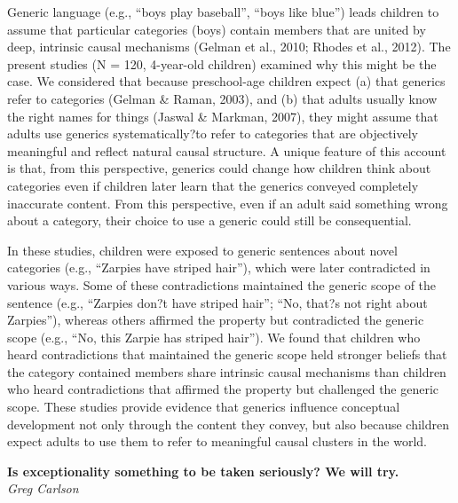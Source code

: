 \documentclass[10pt,letterpaper]{article}
\begin{document}
Generic language (e.g., ``boys play baseball'', ``boys like blue'') leads children to assume that particular categories (boys) contain members that are united by deep, intrinsic causal mechanisms (Gelman et al., 2010; Rhodes et al., 2012). 
The present studies (N = 120, 4-year-old children) examined why this might be the case. 
We considered that because preschool-age children expect (a) that generics refer to categories (Gelman \& Raman, 2003), and (b) that adults usually know the right names for things (Jaswal \& Markman, 2007), they might assume that adults use generics systematically?to refer to categories that are objectively meaningful and reflect natural causal structure. 
A unique feature of this account is that, from this perspective, generics could change how children think about categories even if children later learn that the generics conveyed completely inaccurate content. 
From this perspective, even if an adult said something wrong about a category, their choice to use a generic could still be consequential.

In these studies, children were exposed to generic sentences about novel categories (e.g., ``Zarpies have striped hair''), which were later contradicted in various ways. 
Some of these contradictions maintained the generic scope of the sentence (e.g., ``Zarpies don?t have striped hair''; ``No, that?s not right about Zarpies''), whereas others affirmed the property but contradicted the generic scope (e.g., ``No, this Zarpie has striped hair''). 
We found that children who heard contradictions that maintained the generic scope held stronger beliefs that the category contained members share intrinsic causal mechanisms than children who heard contradictions that affirmed the property but challenged the generic scope. 
These studies provide evidence that generics influence conceptual development not only through the content they convey, but also because children expect adults to use them to refer to meaningful causal clusters in the world.

\noindent\textbf{Is exceptionality something to be taken seriously?  We will try.} \\
\noindent\emph{Greg Carlson}
\end{document}
